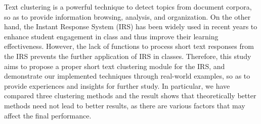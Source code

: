 Text clustering is a powerful technique to detect topics from document corpora, so as to provide information browsing, analysis, and organization. On the other hand, the Instant Response System (IRS) has been widely used in recent years to enhance student engagement in class and thus improve their learning effectiveness. However, the lack of functions to process short text responses from the IRS prevents the further application of IRS in classes. Therefore, this study aims to propose a proper short text clustering module for the IRS, and demonstrate our implemented techniques through real-world examples, so as to provide experiences and insights for further study. In particular, we have compared three clustering methods and the result shows that theoretically better methods need not lead to better results, as there are various factors that may affect the final performance.
